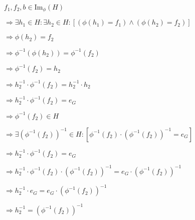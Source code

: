\documentclass[12pt, a4paper]{article}
\begin{document}
\hspace{2mm} $f_1,f_2,b\in$Im$_{\phi}(H)$\par
\vspace{2mm}
\hspace{10mm} $\Rightarrow\exists h_1\in H\colon\exists h_2\in H\colon[(\phi(h_1)=f_1)\wedge(\phi(h_2)=f_2)]$\par
\vspace{2mm}
\hspace{10mm} $\Rightarrow\phi(h_2)=f_2$\par
\vspace{2mm}
\hspace{10mm} $\Rightarrow\phi^{-1}(\phi(h_2))=\phi^{-1}(f_2)$\par
\vspace{2mm}
\hspace{10mm} $\Rightarrow\phi^{-1}(f_2)=h_2$\par
\vspace{2mm}
\hspace{10mm} $\Rightarrow h^{-1}_2\cdot\phi^{-1}(f_2)=h^{-1}_2\cdot h_2$\par
\vspace{2mm}
\hspace{10mm} $\Rightarrow h^{-1}_2\cdot\phi^{-1}(f_2)=e_G$\par
\vspace{2mm}
\hspace{10mm} $\Rightarrow\phi^{-1}(f_2)\in H$\par
\vspace{2mm}
\hspace{10mm} $\Rightarrow\exists(\phi^{-1}(f_2))^{-1}\in H\colon[\phi^{-1}(f_2)\cdot(\phi^{-1}(f_2))^{-1}=e_G]$\par
\vspace{2mm}
\hspace{10mm} $\Rightarrow h^{-1}_2\cdot\phi^{-1}(f_2)=e_G$\par
\vspace{2mm}
\hspace{10mm} $\Rightarrow h^{-1}_2\cdot\phi^{-1}(f_2)\cdot(\phi^{-1}(f_2))^{-1}=e_G\cdot(\phi^{-1}(f_2))^{-1}$\par
\vspace{2mm}
\hspace{10mm} $\Rightarrow h^{-1}_2\cdot e_G=e_G\cdot(\phi^{-1}(f_2))^{-1}$\par
\vspace{2mm}
\hspace{10mm} $\Rightarrow h^{-1}_2=(\phi^{-1}(f_2))^{-1}$\par
\end{document}
